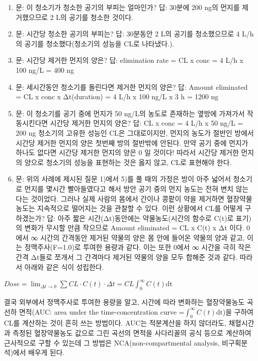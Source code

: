\documentclass[
  11pt,
  krantz2, a4paper, twoside]{krantz}
\makeatletter
\newenvironment{kframe}{%
\medskip{}
\setlength{\fboxsep}{.8em}
 \def\at@end@of@kframe{}%
 \ifinner\ifhmode%
  \def\at@end@of@kframe{\end{minipage}}%
  \begin{minipage}{\columnwidth}%
 \fi\fi%
 \def\FrameCommand##1{\hskip\@totalleftmargin \hskip-\fboxsep
 \colorbox{shadecolor}{##1}\hskip-\fboxsep
     \hskip-\linewidth \hskip-\@totalleftmargin \hskip\columnwidth}%
 \MakeFramed {\advance\hsize-\width
   \@totalleftmargin\z@ \linewidth\hsize
   \@setminipage}}%
 {\par\unskip\endMakeFramed%
 \at@end@of@kframe}
\newenvironment{rmdblock}[1]
  {
  \begin{itemize}
  \renewcommand{\labelitemi}{
    \raisebox{-.7\height}[0pt][0pt]{
      {\setkeys{Gin}{width=3em,keepaspectratio}\texttt{[image: images/\#1]}}
    }
  }
  \setlength{\fboxsep}{1em}
  \begin{kframe}
  \item
  }
  {
  \end{kframe}
  \end{itemize}
  }
\newenvironment{rmdtip}
  {\begin{rmdblock}{tip}}
  {\end{rmdblock}}
\makeatother
\begin{document}
\begin{rmdtip}
\begin{enumerate}
\def\labelenumi{\arabic{enumi}.}
\item
  문: 이 청소기가 청소한 공기의 부피는 얼마인가?
  답: 30분에 200 ng의 먼지를 제거했으므로 2 L의 공기를 청소한 것이다.
\item
  문: 시간당 청소한 공기의 부피는?
  답: 30분동안 2 L의 공기를 청소했으므로 4 L/h의 공기를
  청소했다(청소기의 성능을 CL로 나타냈다.).
\item
  문: 시간당 제거한 먼지의 양은?
  답: elimination rate = CL x conc = 4 L/h x 100 ng/L = 400 ng
\item
  문: 세시간동안 청소기를 돌린다면 제거한 먼지의 양은?
  답: Amount eliminated = CL x conc x Δt(duration) = 4 L/h x 100 ng/L x 3 h = 1200 ng
\item
  문: 이 청소기를 공기 중에 먼지가 50 ng/L의 농도로 존재하는 옆방에 가져가서 작동시킨다면 시간당 제거한 먼지의 양은?
  답: CL x conc = 4 L/h x 50 ng/L = 200 ng 청소기의 고유한 성능인 CL은
  그대로이지만, 먼지의 농도가 절반인 방에서 시간당 제거한 먼지의 양은
  첫번째 방의 절반밖에 안된다. 만약 공기 중에 먼지가 하나도 없다면
  시간당 제거한 먼지의 양은 0 일 것이다! 따라서 시간당 제거한 먼지의
  양으로 청소기의 성능을 표현하는 것은 옳지 않고, CL로 표현해야 한다.
\item
  문: 위의 사례에 제시된 질문 1)에서 5)를 풀 때의 가정은 방이 아주 넓어서 청소기로 먼지를 몇시간 빨아들였다고 해서 방안 공기 중의 먼지 농도는 전혀 변치 않는다는 것이었다. 그러나 실제 사람의 몸에서 간이나 콩팥이 약을 제거하면 혈장약물농도는 지속적으로 떨어지는 것을 관찰할 수 있다. 이런 상황에서 CL를 어떻게 구하겠는가?
  답: 아주 짧은 시간(Δt)동안에는 약물농도(시간의 함수로 C(t)로 표기)의
  변화가 무시할 만큼 작으므로 Amount eliminated = CL x C(t) x Δt 이다.
  0에서 ∞ 시간의 간격동안 제거된 약물의 양은 몸 안에 들어온 약물의 양과
  같고, 이는 정맥주사(F=1.0)로 투여한 용량과 같다. 이는 또한 0에서 ∞
  시간을 극히 작은 간격 Δt들로 쪼개서 그 간격마다 제거된 약물의 양을
  모두 합해준 것과 같다. 따라서 아래와 같은 식이 성립한다.
\end{enumerate}

\(Dose = \lim_{\Delta t \rightarrow 0}{\sum_{}^{}{CL \cdot C\left( t \right) \cdot \Delta t = CL\int_{0}^{\infty}{C\left( t \right)\text{dt}}}}\)

결국 외부에서 정맥주사로 투여한 용량을 알고, 시간에 따라 변화하는 혈장약물농도 곡선하 면적(AUC: area under the time-concentration curve =\(\int_{0}^{\infty}{C\left( t \right)\text{dt}}\))을 구하여 CL를 계산하는 것이 흔히 쓰는 방법이다.
AUC는 적분계산을 하지 않더라도, 채혈시간과 측정된 혈장약물농도 값으로 그린 곡선의 면적을 사다리꼴의 공식 등으로 계산하여 근사적으로 구할 수 있는데 그 방법은 NCA(non-compartmental analysis, 비구획분석)에서 배우게 된다.
\end{rmdtip}
\end{document}
